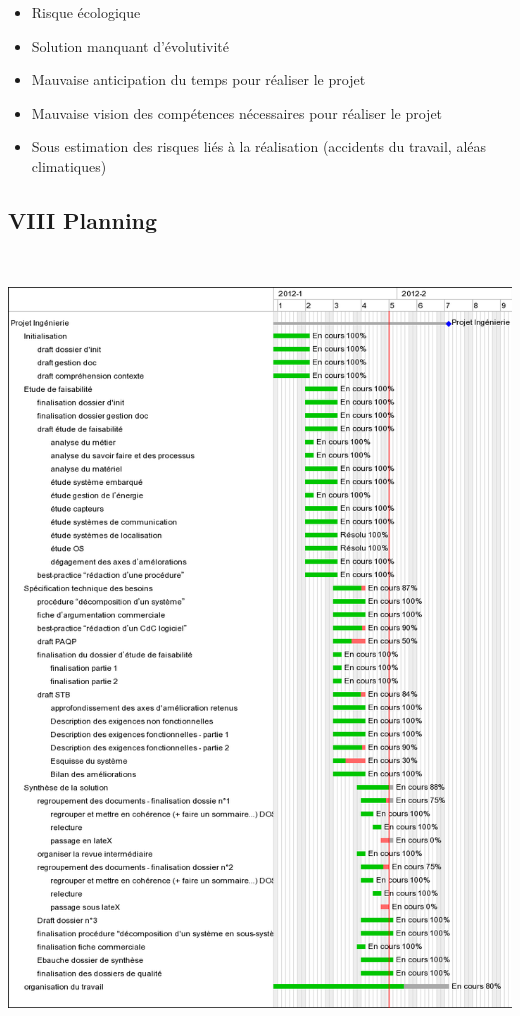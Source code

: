 \documentclass{article}
\begin{document}
\begin{itemize}
\item Risque écologique
\item Solution manquant d’évolutivité
\item Mauvaise anticipation du temps pour réaliser le projet
\item Mauvaise vision des compétences nécessaires pour réaliser le
projet
\item Sous estimation des risques liés à la réalisation (accidents du
travail, aléas climatiques)
\end{itemize}
\subsection[VIII Planning]{VIII Planning}

\includegraphics[width=14.579cm,height=20.876cm]{Dossierdinitialisationgestion-img1.png}
\end{document}
